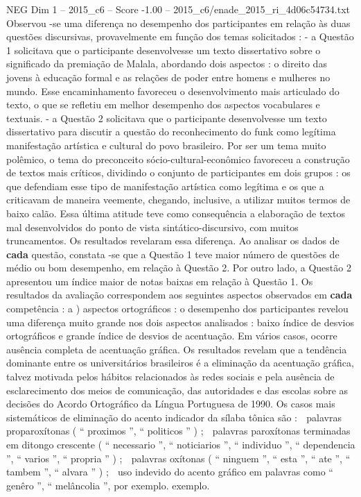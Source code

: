 \begin{textsample}{NEG Dim 1 – 2015\_c6 – Score -1.00 – 2015\_c6/enade\_2015\_ri\_4d06c54734.txt}
Observou -se uma diferença no desempenho dos participantes em relação às duas questões discursivas, provavelmente em função dos temas solicitados : - a Questão 1 solicitava que o participante desenvolvesse um texto dissertativo sobre o significado da premiação de Malala, abordando dois aspectos : o direito das jovens à educação formal e as relações de poder entre homens e mulheres no mundo.
Esse encaminhamento favoreceu o desenvolvimento mais articulado do texto, o que se refletiu em melhor desempenho dos aspectos vocabulares e textuais. - a Questão 2 solicitava que o participante desenvolvesse um texto dissertativo para discutir a questão do reconhecimento do funk como legítima manifestação artística e cultural do povo brasileiro.
Por ser um tema muito polêmico, o tema do preconceito sócio-cultural-econômico favoreceu a construção de textos mais críticos, dividindo o conjunto de participantes em dois grupos : os que defendiam esse tipo de manifestação artística como legítima e os que a criticavam de maneira veemente, chegando, inclusive, a utilizar muitos termos de baixo calão.
Essa última atitude teve como consequência a elaboração de textos mal desenvolvidos do ponto de vista sintático-discursivo, com muitos truncamentos.
Os resultados revelaram essa diferença.
Ao analisar os dados de \textbf{cada} questão, constata -se que a Questão 1 teve maior número de questões de médio ou bom desempenho, em relação à Questão 2.
Por outro lado, a Questão 2 apresentou um índice maior de notas baixas em relação à Questão 1.
Os resultados da avaliação correspondem aos seguintes aspectos observados em \textbf{cada} competência : a ) aspectos ortográficos : o desempenho dos participantes revelou uma diferença muito grande nos dois aspectos analisados : baixo índice de desvios ortográficos e grande índice de desvios de acentuação.
Em vários casos, ocorre ausência completa de acentuação gráfica.
Os resultados revelam que a tendência dominante entre os universitários brasileiros é a eliminação da acentuação gráfica, talvez motivada pelos hábitos relacionados às redes sociais e pela ausência de esclarecimento dos meios de comunicação, das autoridades e das escolas sobre as decisões do Acordo Ortográfico da Língua Portuguesa de 1990.
Os casos mais sistemáticos de eliminação do acento indicador da sílaba tônica são :  palavras proparoxítonas ( “ proximos ”, “ politicos ” ) ;  palavras paroxítonas terminadas em ditongo crescente ( “ necessario ”, “ noticiarios ”, “ individuo ”, “ dependencia ”, “ varios ”, “ propria ” ) ;  palavras oxítonas ( “ ninguem ”, “ esta ”, “ ate ”, “ tambem ”, “ alvara ” ) ;  uso indevido do acento gráfico em palavras como “ genêro ”, “ melâncolia ”, por exemplo. exemplo.

\end{textsample}
